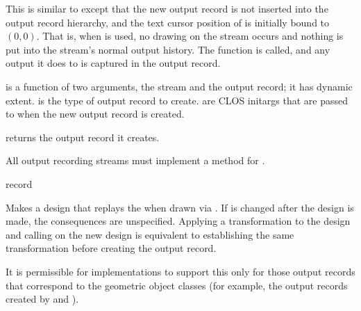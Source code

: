 This is similar to  except that the new output
record is not inserted into the output record hierarchy, and the text cursor
position of  is initially bound to $(0,0)$.  That is, when
 is used, no drawing on the stream
occurs and nothing is put into the stream's normal output history.  The function
 is called, and any output it does to  is captured in
the output record.

 is a function of two arguments, the stream and the output
record; it has dynamic extent.   is the type of output record
to create.   are CLOS initargs that are passed to
 when the new output record is created.

 returns the output record it creates.

All output recording streams must implement a method for
.


 {record}

Makes a design that replays the   when drawn via
.  If  is changed after the design is made, the
consequences are unspecified.  Applying a transformation to the design and
calling  on the new design is equivalent to establishing the
same transformation before creating the output record.

It is permissible for implementations to support this only for those output
records that correspond to the geometric object classes (for example, the output
records created by  and ).
